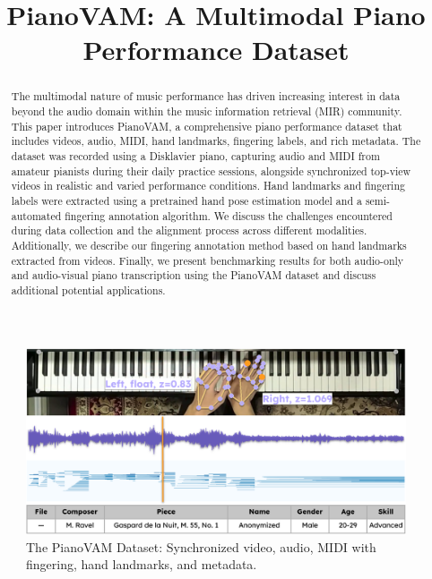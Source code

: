 \documentclass{article}
\title{PianoVAM: A Multimodal Piano Performance Dataset}
\begin{document}
\maketitle

\begin{abstract}

The multimodal nature of music performance has driven increasing interest in data beyond the audio domain within the music information retrieval (MIR) community.
This paper introduces PianoVAM, a comprehensive piano performance dataset that includes videos, audio, MIDI, hand landmarks, fingering labels, and rich metadata.
The dataset was recorded using a Disklavier piano, capturing audio and MIDI from amateur pianists during their daily practice sessions, alongside synchronized top-view videos in realistic and varied performance conditions. 
Hand landmarks and fingering labels were extracted using a pretrained hand pose estimation model and a semi-automated fingering annotation algorithm.
We discuss the challenges encountered during data collection and the alignment process across different modalities. Additionally, we describe our fingering annotation method based on hand landmarks extracted from videos.
Finally, we present benchmarking results for both audio-only and audio-visual piano transcription using the PianoVAM dataset and discuss additional potential applications. 

\end{abstract}

\begin{figure}
    \centering
    \includegraphics[width=1\linewidth]{Images/teaser_image.png}
    \caption{The PianoVAM Dataset: Synchronized video, audio, MIDI with fingering, hand landmarks, and metadata.}
    \label{fig:overview}
\vspace{-5mm}    
\end{figure}
\end{document}
